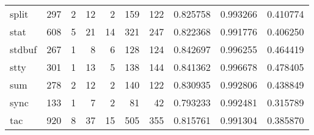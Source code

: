 \begin{longtable}{lrrrrrrrrr}
split     &                    297 &                                  2 &                                12 &                                2 &                               159 &                             122 &                                0.825758 &                               0.993266 &                             0.410774 \\
stat      &                    608 &                                  5 &                                21 &                               14 &                               321 &                             247 &                                0.822368 &                               0.991776 &                             0.406250 \\
stdbuf    &                    267 &                                  1 &                                 8 &                                6 &                               128 &                             124 &                                0.842697 &                               0.996255 &                             0.464419 \\
stty      &                    301 &                                  1 &                                13 &                                5 &                               138 &                             144 &                                0.841362 &                               0.996678 &                             0.478405 \\
sum       &                    278 &                                  2 &                                12 &                                2 &                               140 &                             122 &                                0.830935 &                               0.992806 &                             0.438849 \\
sync      &                    133 &                                  1 &                                 7 &                                2 &                                81 &                              42 &                                0.793233 &                               0.992481 &                             0.315789 \\
tac       &                    920 &                                  8 &                                37 &                               15 &                               505 &                             355 &                                0.815761 &                               0.991304 &                             0.385870 \\

\end{longtable}
